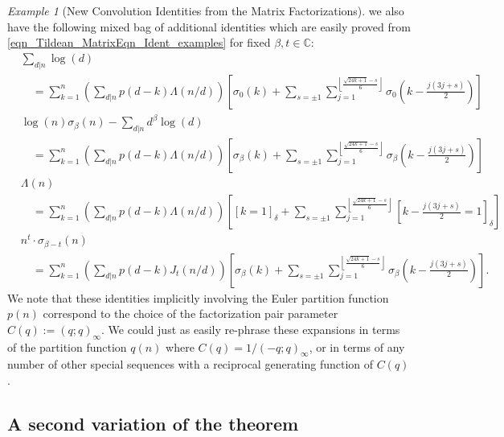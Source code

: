 \documentclass[10pt,reqno]{amsart}
\numberwithin{figure}{section}
\numberwithin{table}{section}
\theoremstyle{plain}
\numberwithin{theorem}{section}
\theoremstyle{remark}
\newtheorem{example}[theorem]{Example}
\begin{document}
\begin{example}[New Convolution Identities from the Matrix Factorizations]
we also have the following mixed bag of additional identities which are easily proved from 
\eqref{eqn_Tildean_MatrixEqn_Ident_examples} for fixed $\beta, t \in \mathbb{C}$: 
\begin{align*} 
 & \sum_{d|n} \log(d) \\ 
 & \quad = \sum_{k=1}^n \left(\sum_{d|n} p(d-k) \Lambda(n/d)\right) \left[ 
     \sigma_{0}(k) + \sum_{s = \pm 1} \sum_{j=1}^{\left\lfloor \frac{\sqrt{24k+1}-s}{6} \right\rfloor} 
     \sigma_{0}\left(k-\frac{j(3j+s)}{2}\right)\right] \\ 
 & \log(n) \sigma_{\beta}(n) - \sum_{d|n} d^{\beta} \log(d) \\ 
 & \quad = \sum_{k=1}^n \left(\sum_{d|n} p(d-k) \Lambda(n/d)\right) \left[ 
     \sigma_{\beta}(k) + \sum_{s = \pm 1} \sum_{j=1}^{\left\lfloor \frac{\sqrt{24k+1}-s}{6} \right\rfloor} 
     \sigma_{\beta}\left(k-\frac{j(3j+s)}{2}\right)\right] \\ 
 & \Lambda(n) \\ 
 & \quad = \sum_{k=1}^n \left(\sum_{d|n} p(d-k) \Lambda(n/d)\right) \left[ 
     {\ensuremath{\left[{k=1}\right]_{\delta}}} + \sum_{s = \pm 1} \sum_{j=1}^{\left\lfloor \frac{\sqrt{24k+1}-s}{6} \right\rfloor} 
     {\ensuremath{\left[{k-\frac{j(3j+s)}{2}=1}\right]_{\delta}}}\right] \\ 
 & n^{t} \cdot \sigma_{\beta-t}(n) \\ 
 & \quad = \sum_{k=1}^n \left(\sum_{d|n} p(d-k) J_t(n/d)\right) \left[ 
     \sigma_{\beta}(k) + \sum_{s = \pm 1} \sum_{j=1}^{\left\lfloor \frac{\sqrt{24k+1}-s}{6} \right\rfloor} 
     \sigma_{\beta}\left(k-\frac{j(3j+s)}{2}\right)\right]. 
\end{align*}
We note that these identities implicitly involving the Euler partition function $p(n)$ correspond to the 
choice of the factorization pair parameter $C(q) := (q; q)_{\infty}$. We could just as easily re-phrase these 
expansions in terms of the partition function $q(n)$ where $C(q) = 1 / (-q; q)_{\infty}$, or in terms of 
any number of other special sequences with a reciprocal generating function of $C(q)$. 
\end{example} 

\subsection{A second variation of the theorem}
\end{document}
